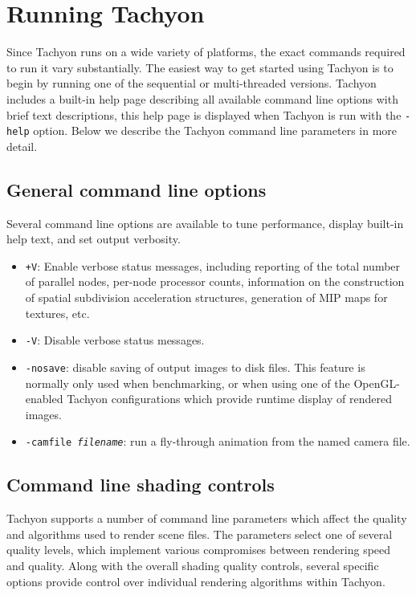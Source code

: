 \section{Running Tachyon}
  Since Tachyon runs on a wide variety of platforms, the exact commands
required to run it vary substantially.  The easiest way to get started
using Tachyon is to begin by running one of the sequential or multi-threaded
versions.  Tachyon includes a built-in help page describing all
available command line options with brief text descriptions, this 
help page is displayed when Tachyon is run with the {\tt -help} option.
Below we describe the Tachyon command line parameters in more detail.


\subsection{General command line options}
Several command line options are available to tune 
performance, display built-in help text, and set output verbosity.
\begin{itemize}
\item{{\tt +V}}: Enable verbose status messages, including reporting of
      the total number of parallel nodes, per-node processor counts,
      information on the construction of spatial subdivision acceleration
      structures, generation of MIP maps for textures, etc.
\item{{\tt -V}}: Disable verbose status messages.
\item{{\tt -nosave}}: disable saving of output images to disk files.  This 
      feature is normally only used when benchmarking, or when using one of
      the OpenGL-enabled Tachyon configurations which provide runtime display
      of rendered images.
\item{{\tt -camfile {\it filename}}}: run a fly-through animation from 
      the named camera file. 
\end{itemize}

\subsection{Command line shading controls}
Tachyon supports a number of command line parameters which affect the
quality and algorithms used to render scene files.  The parameters 
select one of several quality levels, which implement various 
compromises between rendering speed and quality.  Along with the
overall shading quality controls, several specific options provide 
control over individual rendering algorithms within Tachyon.

